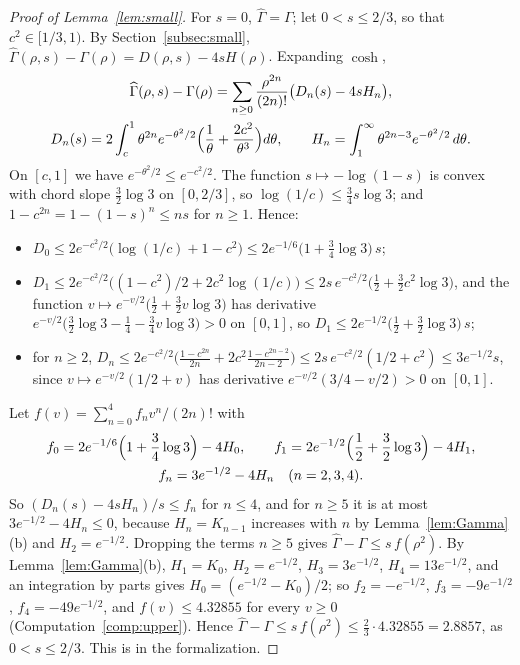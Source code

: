 \documentclass[12pt]{amsart}
\theoremstyle{definition}
\numberwithin{equation}{section}
\newcommand{\Ghat}{\widehat{\Gamma}}
\begin{document}
\begin{proof}[Proof of Lemma~\ref{lem:small}]
For $s=0$, $\Ghat=\Gamma$; let $0<s\le2/3$, so that $c^2\in[1/3,1)$. By Section~\ref{subsec:small}, $\Ghat(\rho,s)-\Gamma(\rho)=D(\rho,s)-4sH(\rho)$. Expanding $\cosh$,
\begin{gather*}
\Ghat(\rho,s)-\Gamma(\rho)=\sum_{n\ge0}\frac{\rho^{2n}}{(2n)!}\bigl(D_n(s)-4sH_n\bigr),\\
D_n(s)=2\int_c^1\theta^{2n}e^{-\theta^2/2}\Bigl(\frac1\theta+\frac{2c^2}{\theta^3}\Bigr)d\theta,\qquad H_n=\int_1^\infty\theta^{2n-3}e^{-\theta^2/2}\,d\theta .
\end{gather*}
On $[c,1]$ we have $e^{-\theta^2/2}\le e^{-c^2/2}$. The function $s\mapsto-\log(1-s)$ is convex with chord slope $\frac32\log3$ on $[0,2/3]$, so $\log(1/c)\le\frac34s\log3$; and $1-c^{2n}=1-(1-s)^n\le ns$ for $n\ge1$. Hence:
\begin{itemize}
\item $D_0\le2e^{-c^2/2}\bigl(\log(1/c)+1-c^2\bigr)\le2e^{-1/6}\bigl(1+\tfrac34\log3\bigr)\,s$;
\item $D_1\le2e^{-c^2/2}\bigl((1-c^2)/2+2c^2\log(1/c)\bigr)\le2s\,e^{-c^2/2}\bigl(\tfrac12+\tfrac32c^2\log3\bigr)$, and the function $v\mapsto e^{-v/2}\bigl(\frac12+\frac32v\log3\bigr)$ has derivative $e^{-v/2}\bigl(\frac32\log3-\frac14-\frac34v\log3\bigr)>0$ on $[0,1]$, so $D_1\le2e^{-1/2}\bigl(\tfrac12+\tfrac32\log3\bigr)\,s$;
\item for $n\ge2$, $D_n\le2e^{-c^2/2}\bigl(\frac{1-c^{2n}}{2n}+2c^2\frac{1-c^{2n-2}}{2n-2}\bigr)\le2s\,e^{-c^2/2}(1/2+c^2)\le3e^{-1/2}s$, since $v\mapsto e^{-v/2}(1/2+v)$ has derivative $e^{-v/2}(3/4-v/2)>0$ on $[0,1]$.
\end{itemize}
Let $f(v)=\sum_{n=0}^4f_nv^n/(2n)!$ with
\[
\begin{gathered}
f_0=2e^{-1/6}\Bigl(1+\frac34\log3\Bigr)-4H_0,\qquad f_1=2e^{-1/2}\Bigl(\frac12+\frac32\log3\Bigr)-4H_1,\\
f_n=3e^{-1/2}-4H_n\quad(n=2,3,4).
\end{gathered}
\]
So $(D_n(s)-4sH_n)/s\le f_n$ for $n\le4$, and for $n\ge5$ it is at most $3e^{-1/2}-4H_n\le0$, because $H_n=K_{n-1}$ increases with $n$ by Lemma~\ref{lem:Gamma}(b) and $H_2=e^{-1/2}$. Dropping the terms $n\ge5$ gives $\Ghat-\Gamma\le s\,f(\rho^2)$. By Lemma~\ref{lem:Gamma}(b), $H_1=K_0$, $H_2=e^{-1/2}$, $H_3=3e^{-1/2}$, $H_4=13e^{-1/2}$, and an integration by parts gives $H_0=(e^{-1/2}-K_0)/2$; so $f_2=-e^{-1/2}$, $f_3=-9e^{-1/2}$, $f_4=-49e^{-1/2}$, and $f(v)\le4.32855$ for every $v\ge0$ (Computation~\ref{comp:upper}). Hence $\Ghat-\Gamma\le s\,f(\rho^2)\le\frac23\cdot4.32855=2.8857$, as $0<s\le2/3$. This is  in the formalization.
\end{proof}
\end{document}
